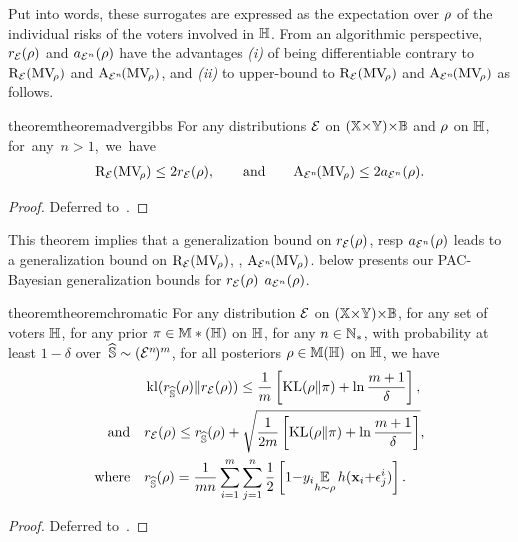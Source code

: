 Put into words, these surrogates are expressed as the expectation over $\rho$ of the individual risks of the voters involved in $\mathbb{H}$. 
From an algorithmic perspective, $r_{{\mathcal{E}}}(\rho)$ and $a_{{\mathcal{E}}^{n}}(\rho)$ have the advantages {\it (i)} of being differentiable contrary to $\text{R}_{{\mathcal{E}}}(\text{MV}_{\!\rho})$ and $\text{A}_{{\mathcal{E}}^{n\!}}(\text{MV}_{\!\rho})$, and {\it (ii)} to upper-bound to $\text{R}_{{\mathcal{E}}}(\text{MV}_{\!\rho})$ and $\text{A}_{{\mathcal{E}}^{n\!}}(\text{MV}_{\!\rho})$ as follows.

\begin{restatable}{theorem}{theoremadvergibbs}\label{chap:mv-robustness:theorem:2-adver-gibbs}
For any distributions ${\mathcal{E}}$ on $(\mathbb{X}{\times}\mathbb{Y}){\times}\mathbb{B}$ and $\rho$ on $\mathbb{H}$, \mbox{for any $n\!>\!1$, we have}
\begin{align*}
    \text{R}_{{\mathcal{E}}}(\text{MV}_{\!\rho}) \le 2  r_{{\mathcal{E}}}(\rho), \qquad\text{and} \qquad \text{A}_{{\mathcal{E}}^{n\!}}(\text{MV}_{\!\rho}) \le 2  a_{{\mathcal{E}}^{n}}(\rho).
\end{align*}
\end{restatable}
\begin{noaddcontents}\begin{proof}
Deferred to~.
\end{proof}\end{noaddcontents}

This theorem implies that a generalization bound on $r_{{\mathcal{E}}}(\rho)$, resp $a_{{\mathcal{E}}^{n}}(\rho)$ leads to a generalization bound on $\text{R}_{{\mathcal{E}}}(\text{MV}_{\!\rho})$, \resp, $\text{A}_{{\mathcal{E}}^{n\!}}(\text{MV}_{\!\rho})$.
 \resp {} below presents our PAC-Bayesian generalization bounds for $r_{{\mathcal{E}}}(\rho)$ \resp $a_{{\mathcal{E}}^{n}}(\rho)$.

\begin{restatable}{theorem}{theoremchromatic}\label{chap:mv-robustness:theorem:chromatic} For any distribution ${\mathcal{E}}$ on $(\mathbb{X}{\times}\mathbb{Y}){\times}\mathbb{B}$, for any set of voters $\mathbb{H}$, for any prior $\pi\in\mathbb{M}*(\mathbb{H})$ on $\mathbb{H}$, for any $n\in\mathbb{N}_{*}$, with probability at least $1{-}\delta$ over~$\widehat{\mathbb{S}}\sim({\mathcal{E}}^{n\!})^m$, for all posteriors $\rho\in\mathbb{M}(\mathbb{H})$ on $\mathbb{H}$, we have
\begin{align}
    & \operatorname{kl}(r_{\widehat{\mathbb{S}}}(\rho)\|r_{{\mathcal{E}}}(\rho)) \le \frac{1}{m} \left[\operatorname{KL}(\rho\|\pi)+\ln\frac{m+1}{\delta} \right], \label{chap:mv-robustness:eq:seeger-chromatic}\\
    \text{and}\quad&r_{{\mathcal{E}}}(\rho) \le r_{\widehat{\mathbb{S}}}(\rho)+\sqrt{\frac{1}{2m}\left[ \operatorname{KL}(\rho\|\pi)+\ln \frac{m+1}{\delta}\right]},\label{chap:mv-robustness:eq:mcallester-chromatic}\\
    \nonumber\text{where}\quad& r_{\widehat{\mathbb{S}}}(\rho) = \frac{1}{m n}\sum_{i=1}^{m}\sum_{j=1}^n\frac{1}{2}\left[ 1{-} y_i\!\operatorname*{\mathbb{E}}_{h\sim\rho}h(\mathbf{x}_i{+}\epsilon^i_j) \right].
\end{align}
\end{restatable}
\begin{noaddcontents}\begin{proof}
Deferred to~.
\end{proof}\end{noaddcontents}


